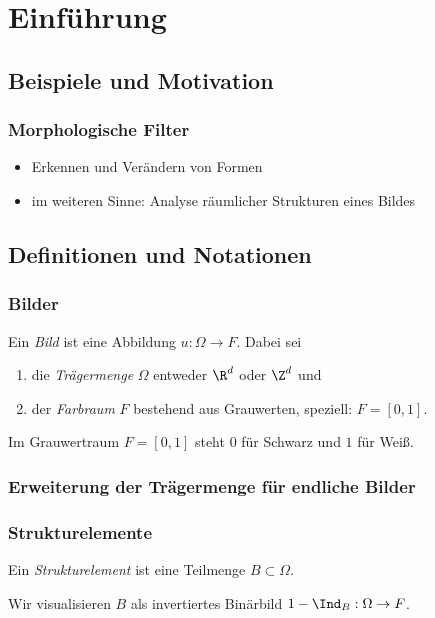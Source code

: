 \documentclass{beamer}
\begin{document}
\section{Einführung}

\subsection{Beispiele und Motivation}

\begin{frame}
    \frametitle{Morphologische Filter}
    \begin{itemize}
        \item
            Erkennen und Verändern von Formen
        \item
            im weiteren Sinne: Analyse räumlicher Strukturen eines Bildes
    \end{itemize}
\end{frame}


\subsection{Definitionen und Notationen}

\begin{frame}
    \frametitle{Bilder}
    \begin{definition}
        Ein \emph{Bild} ist eine Abbildung $u: \Omega \to F$. \pause
        Dabei sei
        \begin{enumerate}[1.]
            \item
                die \emph{Trägermenge} $\Omega$ entweder $\R^d$ oder $\Z^d$ \pause und
            \item
                der \emph{Farbraum} $F$ bestehend aus Grauwerten, speziell: $F = [0,1]$.
        \end{enumerate}
    \end{definition}
    \pause
    Im Grauwertraum $F = [0,1]$ steht $0$ für Schwarz und $1$ für Weiß.
\end{frame}

\begin{frame}
    \frametitle{Erweiterung der Trägermenge für endliche Bilder}
\end{frame}

\begin{frame}
    \frametitle{Strukturelemente}
    \begin{definition}
        Ein \emph{Strukturelement} ist eine Teilmenge $B \subset \Omega$.
    \end{definition}
    \pause
    Wir visualisieren $B$ als invertiertes Binärbild $1 - \Ind_B: \Omega \to F$.
\end{frame}
\end{document}
